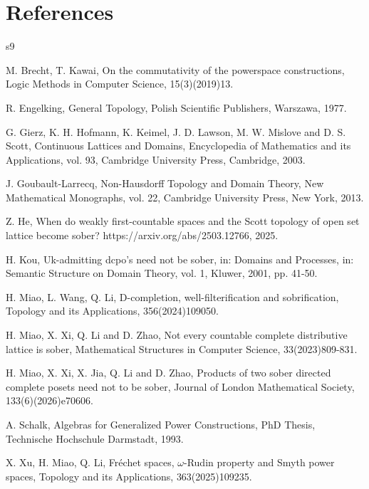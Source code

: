 \documentclass[preprint,12pt]{elsarticle}
\numberwithin{equation}{section}
\begin{document}
\section*{References}
\begin{thebibliography}{s9}


 M. Brecht, T. Kawai, On the commutativity of the powerspace constructions, Logic Methods in Computer Science, 15(3)(2019)13.

 R. Engelking, General Topology, Polish Scientific Publishers, Warszawa, 1977.

 G. Gierz, K. H. Hofmann, K. Keimel, J. D. Lawson, M. W. Mislove and D. S. Scott, Continuous Lattices and Domains, Encyclopedia of Mathematics and its Applications, vol. 93, Cambridge University Press, Cambridge, 2003.

 J. Goubault-Larrecq, Non-Hausdorff Topology and Domain Theory, New Mathematical Monographs, vol. 22, Cambridge University Press, New York, 2013.

 Z. He, When do weakly first-countable spaces and the Scott topology of open set lattice become sober? https://arxiv.org/abs/2503.12766, 2025.



 H. Kou, Uk-admitting dcpo's need not be sober, in: Domains and Processes, in: Semantic Structure on Domain Theory, vol. 1, Kluwer, 2001, pp. 41-50.


H. Miao, L. Wang, Q. Li, D-completion, well-filterification and sobrification, Topology and its Applications, 356(2024)109050.

 H. Miao, X. Xi, Q. Li and D. Zhao, Not every countable complete distributive lattice is sober, Mathematical Structures in Computer Science, 33(2023)809-831.


 H. Miao, X. Xi, X. Jia, Q. Li and D. Zhao, Products of two sober directed complete posets need not to be sober, Journal of London Mathematical Society, 133(6)(2026)e70606.






 A. Schalk, Algebras for Generalized Power Constructions, PhD Thesis, Technische Hochschule Darmstadt, 1993.


 X. Xu, H. Miao, Q. Li, Fr\'echet spaces, $\omega$-Rudin property and Smyth power spaces, Topology and its Applications, 363(2025)109235.


\end{thebibliography}
\end{document}
